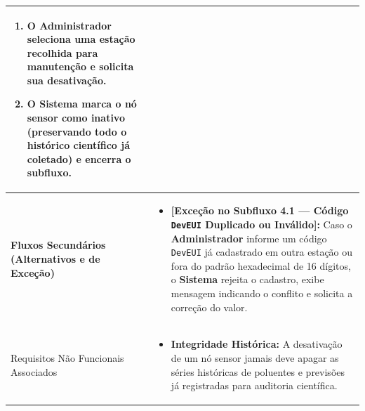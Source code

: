 \documentclass[11pt, a4paper]{article}
\begin{document}
\begin{longtable}{|>{\bfseries}p{3.8cm}|p{12.4cm}|}
\begin{enumerate}[nosep, leftmargin=0.5cm]
\begin{itemize}[nosep, leftmargin=0.5cm]
        \begin{enumerate}[nosep, leftmargin=0.5cm]
            \item O \textbf{Administrador} seleciona uma estação recolhida para manutenção e solicita sua desativação.
            \item O \textbf{Sistema} marca o nó sensor como inativo (preservando todo o histórico científico já coletado) e encerra o subfluxo.
        \end{enumerate}
    \end{itemize}
\end{enumerate} \\ \hline

Fluxos Secundários (Alternativos e de Exceção) & 
\begin{itemize}[nosep, leftmargin=0.5cm]
    \item \textbf{[Exceção no Subfluxo 4.1 --- Código \texttt{DevEUI} Duplicado ou Inválido]:} Caso o \textbf{Administrador} informe um código \texttt{DevEUI} já cadastrado em outra estação ou fora do padrão hexadecimal de 16 dígitos, o \textbf{Sistema} rejeita o cadastro, exibe mensagem indicando o conflito e solicita a correção do valor.
\end{itemize} \\ \hline

Requisitos Não Funcionais Associados & 
\begin{itemize}[nosep, leftmargin=0.5cm]
    \item \textbf{Integridade Histórica:} A desativação de um nó sensor jamais deve apagar as séries históricas de poluentes e previsões já registradas para auditoria científica.
\end{itemize} \\ \hline
\end{longtable}
\end{document}
